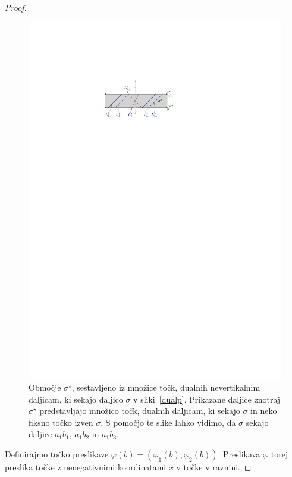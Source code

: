 \documentclass[a4paper, 12pt]{book}
\begin{document}
\begin{proof}
\begin{figure}[htp]
\centerline{\includegraphics[scale=1.2]{pics/duality-vertical-slab.pdf}}
\caption{Območje $\sigma^\star$, sestavljeno iz množice točk, dualnih nevertikalnim daljicam, ki sekajo daljico $\sigma$ v sliki~\ref{dualp}. Prikazane daljice znotraj $\sigma^\star$ predstavljajo množico točk, dualnih daljicam, ki sekajo $\sigma$ in neko fiksno točko izven $\sigma$. S pomočjo te slike lahko vidimo, da $\sigma$ sekajo daljice $a_1b_1$, $a_1b_2$ in $a_1b_3$.} 
\label{hslab}
\end{figure}

Definirajmo točko preslikave $\varphi(b)=(\varphi_1(b),\varphi_2(b))$. Preslikava $\varphi$ torej preslika točke z nenegativnimi koordinatami $x$ v točke v ravnini.


\end{proof}
\end{document}
